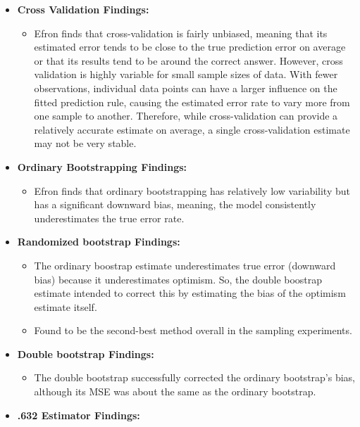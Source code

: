 \documentclass[
  letterpaper,
  DIV=11,
  numbers=noendperiod]{scrreprt}
\providecommand{\tightlist}{%
  \setlength{\itemsep}{0pt}\setlength{\parskip}{0pt}}
\begin{document}
\begin{itemize}
\tightlist
\item
  \textbf{Cross Validation Findings:}

  \begin{itemize}
  \tightlist
  \item
    Efron finds that cross-validation is fairly unbiased, meaning that
    its estimated error tends to be close to the true prediction error
    on average or that its results tend to be around the correct answer.
    However, cross validation is highly variable for small sample sizes
    of data. With fewer observations, individual data points can have a
    larger influence on the fitted prediction rule, causing the
    estimated error rate to vary more from one sample to another.
    Therefore, while cross-validation can provide a relatively accurate
    estimate on average, a single cross-validation estimate may not be
    very stable.
  \end{itemize}
\item
  \textbf{Ordinary Bootstrapping Findings:}

  \begin{itemize}
  \tightlist
  \item
    Efron finds that ordinary bootstrapping has relatively low
    variability but has a significant downward bias, meaning, the model
    consistently underestimates the true error rate.
  \end{itemize}
\item
  \textbf{Randomized bootstrap Findings:}

  \begin{itemize}
  \tightlist
  \item
    The ordinary boostrap estimate underestimates true error (downward
    bias) because it underestimates optimism. So, the double boostrap
    estimate intended to correct this by estimating the bias of the
    optimism estimate itself.
  \item
    Found to be the second-best method overall in the sampling
    experiments.
  \end{itemize}
\item
  \textbf{Double bootstrap Findings:}

  \begin{itemize}
  \tightlist
  \item
    The double bootstrap successfully corrected the ordinary bootstrap's
    bias, although its MSE was about the same as the ordinary bootstrap.
  \end{itemize}
\item
  \textbf{.632 Estimator Findings:}


\end{itemize}
\end{document}
